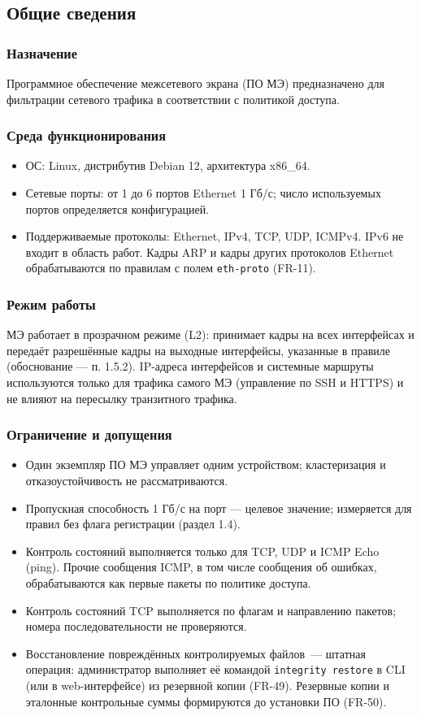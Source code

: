 \documentclass[13pt,a4paper,final]{article}
\begin{document}
	\subsection{Общие сведения}
	\subsubsection{Назначение}
	Программное обеспечение межсетевого экрана (ПО МЭ) предназначено для фильтрации сетевого трафика в соответствии с политикой доступа. 
	\subsubsection{Среда функционирования}
	\begin{itemize}
		\item ОС: Linux, дистрибутив Debian 12, архитектура x86\_64.
		\item Сетевые порты: от 1 до 6 портов Ethernet 1 Гб/с; число используемых портов определяется конфигурацией.
		\item Поддерживаемые протоколы: Ethernet, IPv4, TCP, UDP, ICMPv4. IPv6 не входит в область работ. Кадры ARP и кадры других протоколов Ethernet обрабатываются по правилам с полем \texttt{eth-proto} (FR-11).
	\end{itemize}
	
	\subsubsection{Режим работы}
	МЭ работает в прозрачном режиме (L2): принимает кадры на всех интерфейсах и передаёт разрешённые кадры на выходные интерфейсы, указанные в правиле (обоснование — п. 1.5.2). IP-адреса интерфейсов и системные маршруты используются только для трафика самого МЭ (управление по SSH и HTTPS) и не влияют на пересылку транзитного трафика.
	
	\subsubsection{Ограничение и допущения}
	\begin{itemize}
		\item Один экземпляр ПО МЭ управляет одним устройством; кластеризация и отказоустойчивость не рассматриваются.
		\item Пропускная способность 1 Гб/с на порт — целевое значение; измеряется для правил без флага регистрации (раздел 1.4).
		\item Контроль состояний выполняется только для TCP, UDP и ICMP Echo (ping). Прочие сообщения ICMP, в том числе сообщения об ошибках, обрабатываются как первые пакеты по политике доступа.
		\item Контроль состояний TCP выполняется по флагам и направлению пакетов; номера последовательности не проверяются.
		\item \textcolor{edit}{Восстановление повреждённых контролируемых файлов~--- штатная операция: администратор выполняет её командой \texttt{integrity restore} в CLI (или в web-интерфейсе) из резервной копии (FR-49). Резервные копии и эталонные контрольные суммы формируются до установки ПО (FR-50).}
	\end{itemize}
	
\end{document}
